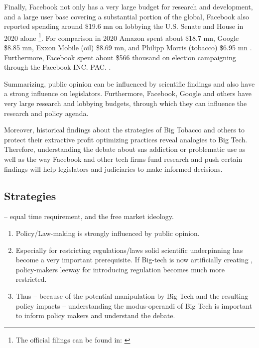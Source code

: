 Finally, Facebook not only has a very large budget for research and development, and a large user base covering a  substantial portion of the global, Facebook also reported spending around \$19.6 \gls{mn}  on lobbying the U.S. Senate and House in 2020 alone \citep{opensecrets_facebook_2021-1}\footnote{The official filings can be found in: \citep{maurer_ld-2_2020-2, maurer_ld-2_2020-1, maurer_ld-2_2020, maurer_ld-2_2021}}.
For comparison in 2020 Amazon spent about \$18.7 \gls{mn}, Google \$8.85 \gls{mn}, Exxon Mobile (oil) \$8.69 \gls{mn}, and Philipp Morris (tobacco) \$6.95 \gls{mn} \citep{khaled_facebook_2021, opensecrets_amazoncom_2021, opensecrets_alphabet_2021, opensecrets_exxon_2021, opensecrets_philip_2021}.
Furthermore, Facebook spent about \$566 thousand on election campaigning through the Facebook INC. PAC. \citep{opensecrets_facebook_2021}.

Summarizing, public opinion can be influenced by scientific findings and also have a strong influence on legislators. Furthermore, Facebook, Google and others have very large research and lobbying budgets, through which they can influence the research and policy agenda. 

Moreover, historical findings about the strategies of Big Tobacco and others to protect their extractive profit optimizing practices reveal analogies to Big Tech.
Therefore, understanding the debate about \gls{sns} addiction or problematic use as well as the way Facebook and other tech firms fund research and push certain findings  will help legislators and judiciaries to make informed decisions.

\subsection{Strategies}
-- equal time requirement, and the free market ideology.
\begin{enumerate}
    \item Policy/Law-making is strongly influenced by public opinion.
    \item Especially for restricting regulations/laws solid scientific underpinning has become a very important prerequisite. If Big-tech is now artificially creating , policy-makers leeway for introducing regulation becomes much more restricted.
    \item Thus -- because of the potential manipulation by Big Tech and the resulting policy impacts -- understanding the modus-operandi of Big Tech is important to inform policy makers and understand the debate.
\end{enumerate}


